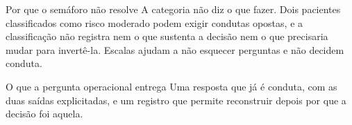 \begin{frame}{}
\begin{center}
\end{center}

\CRvg
\begin{caixaagir}{Por que o sem\'aforo n\~ao resolve}
A categoria n\~ao diz o que fazer. Dois pacientes classificados como risco
moderado podem exigir condutas opostas, e a classifica\c{c}\~ao n\~ao registra
nem o que sustenta a decis\~ao nem o que precisaria mudar para invert\^e-la.
Escalas ajudam a n\~ao esquecer perguntas e n\~ao decidem conduta.
\end{caixaagir}

\CRvg
\begin{caixaproteger}{O que a pergunta operacional entrega}
Uma resposta que j\'a \'e conduta, com as duas sa\'idas explicitadas, e um
registro que permite reconstruir depois por que a decis\~ao foi aquela.
\end{caixaproteger}
\end{frame}

